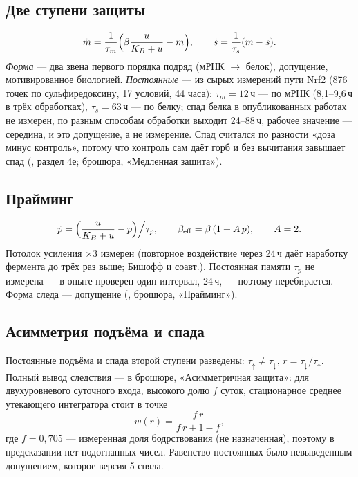 \documentclass[11pt,a4paper]{article}
\theoremstyle{remark}
\newcommand{\code}[1]{\texttt{\detokenize{#1}}}
\begin{document}
\subsection{Две ступени защиты}
\begin{equation}
\dot m=\frac{1}{\tau_m}\Bigl(\beta\frac{u}{K_B+u}-m\Bigr),\qquad
\dot s=\frac{1}{\tau_s}(m-s).
\end{equation}
\emph{Форма} --- два звена первого порядка подряд (мРНК $\to$ белок), допущение,
мотивированное биологией. \emph{Постоянные} --- из сырых измерений пути Nrf2 (876 точек
по сульфиредоксину, 17 условий, 44 часа): $\tau_m=12$\,ч --- по мРНК (8,1--9,6\,ч в трёх
обработках), $\tau_s=63$\,ч --- по белку; спад белка в опубликованных работах не
измерен, по разным способам обработки выходит 24--88\,ч, рабочее значение --- середина,
и это допущение, а не измерение. Спад считался по разности «доза минус контроль»,
потому что контроль сам даёт горб и без вычитания завышает спад
(\code{mass_core6.py}, раздел 4е; брошюра, «Медленная защита»).

\subsection{Прайминг}
\begin{equation}
\dot p = \Bigl(\frac{u}{K_B+u}-p\Bigr)\Big/\tau_p,\qquad
\beta_{\mathrm{eff}}=\beta\,(1+A\,p),\qquad A=2.
\end{equation}
Потолок усиления $\times3$ измерен (повторное воздействие через 24\,ч даёт наработку
фермента до трёх раз выше; Бишофф и соавт.). Постоянная памяти $\tau_p$ не измерена ---
в опыте проверен один интервал, 24\,ч, --- поэтому перебирается. Форма следа ---
допущение (\code{px/rules/f19.py}, брошюра, «Прайминг»).

\subsection{Асимметрия подъёма и спада}
Постоянные подъёма и спада второй ступени разведены: $\tau_{\uparrow}\ne\tau_{\downarrow}$,
$r=\tau_{\downarrow}/\tau_{\uparrow}$. Полный вывод следствия --- в брошюре,
«Асимметричная защита»: для двухуровневого суточного входа, высокого долю $f$ суток,
стационарное среднее утекающего интегратора стоит в точке
\begin{equation}
w(r)=\frac{f\,r}{f\,r+1-f},
\end{equation}
где $f=0{,}705$ --- измеренная доля бодрствования (не назначенная), поэтому в
предсказании нет подогнанных чисел. Равенство постоянных было невыведенным допущением,
которое версия 5 сняла.
\end{document}
